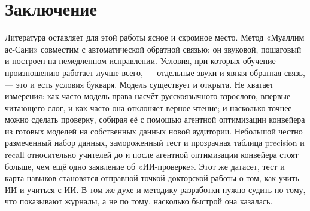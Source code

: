 \documentclass[a4paper,14pt]{extarticle}
\begin{document}
\section{Заключение}

Литература оставляет для этой работы ясное и скромное место. Метод «Муаллим ас-Сани» совместим с
автоматической обратной связью: он звуковой, пошаговый и построен на немедленном исправлении. Условия,
при которых обучение произношению работает лучше всего, --- отдельные звуки и явная обратная связь,
--- это и есть условия букваря. Модель существует и открыта. Не хватает измерения: как часто модель
права насчёт русскоязычного взрослого, впервые читающего слог, и как часто она отклоняет верное чтение;
и насколько точнее можно сделать проверку, собирая её с помощью агентной оптимизации конвейера из готовых моделей на собственных данных новой аудитории. Небольшой честно размеченный набор данных, замороженный тест и прозрачная таблица precision и
recall относительно учителей до и после агентной оптимизации конвейера стоят больше, чем ещё одно заявление об
«ИИ-проверке». Этот же датасет, тест и карта навыков становятся отправной точкой докторской работы о том, как
учить ИИ и учиться с ИИ. В том же духе и
методику разработки нужно судить по тому, что показывают журналы, а не по тому, насколько быстрой она
казалась.

\printbibliography[heading=bibintoc,title={Список источников}]
\end{document}
